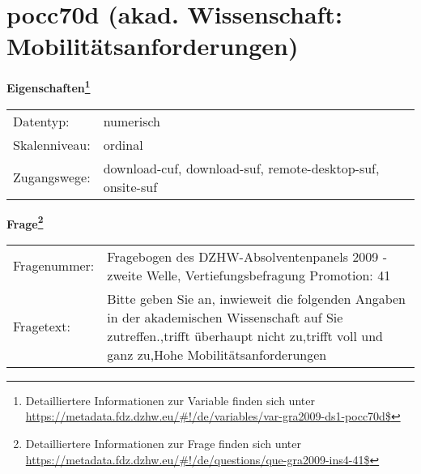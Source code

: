 
    \setcounter{footnote}{0}

    \vspace*{-1.8cm}
	\section{pocc70d (akad. Wissenschaft: Mobilitätsanforderungen)}
	\label{section:pocc70d}



    \vspace*{0.5cm}
    \noindent\textbf{Eigenschaften\footnote{Detailliertere Informationen zur Variable finden sich unter
		\url{https://metadata.fdz.dzhw.eu/\#!/de/variables/var-gra2009-ds1-pocc70d$}}}\\
	\begin{tabularx}{\hsize}{@{}lX}
	Datentyp: & numerisch \\
	Skalenniveau: & ordinal \\
	Zugangswege: &
	  download-cuf, 
	  download-suf, 
	  remote-desktop-suf, 
	  onsite-suf
 \\
    \end{tabularx}



				\vspace*{0.5cm}
                \noindent\textbf{Frage\footnote{Detailliertere Informationen zur Frage finden sich unter
		              \url{https://metadata.fdz.dzhw.eu/\#!/de/questions/que-gra2009-ins4-41$}}}\\
				\begin{tabularx}{\hsize}{@{}lX}
					Fragenummer: &
					  Fragebogen des DZHW-Absolventenpanels 2009 - zweite Welle, Vertiefungsbefragung Promotion:
					  41
 \\
					Fragetext: & Bitte geben Sie an, inwieweit die folgenden Angaben in der akademischen Wissenschaft auf Sie zutreffen.,trifft überhaupt nicht zu,trifft voll und ganz zu,Hohe Mobilitätsanforderungen \\
				\end{tabularx}





